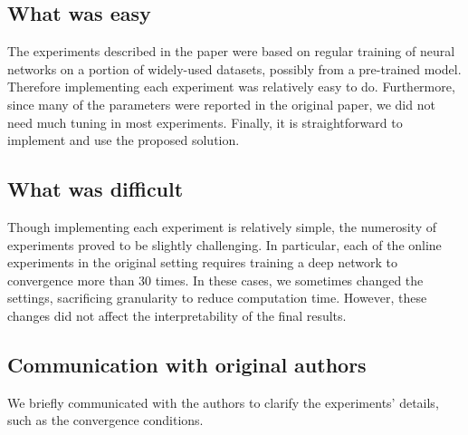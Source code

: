 \documentclass{article}
\begin{document}
\subsection*{What was easy}

The experiments described in the paper were based on regular training of neural networks on a portion of widely-used datasets, possibly from a pre-trained model. Therefore implementing each experiment was relatively easy to do. Furthermore, since many of the parameters were reported in the original paper, we did not need much tuning in most experiments. Finally, it is straightforward to implement and use the proposed solution. 

\subsection*{What was difficult}

Though implementing each experiment is relatively simple, the numerosity of experiments proved to be slightly challenging. In particular, each of the online experiments in the original setting requires training a deep network to convergence more than 30 times. In these cases, we sometimes changed the settings, sacrificing granularity to reduce computation time. However, these changes did not affect the interpretability of the final results. 
\subsection*{Communication with original authors}
We briefly communicated with the authors to clarify the experiments' details, such as the convergence conditions.



%

\end{document}
